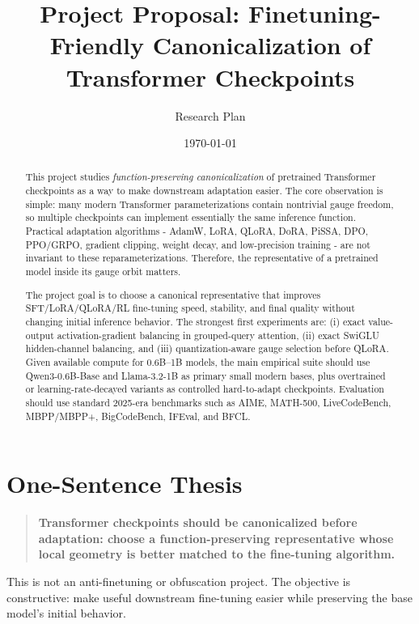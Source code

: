 \documentclass[11pt]{article}
\title{Project Proposal: Finetuning-Friendly Canonicalization of Transformer Checkpoints}
\author{Research Plan}
\date{\today}
\begin{document}
\maketitle

\begin{abstract}
This project studies \emph{function-preserving canonicalization} of pretrained Transformer checkpoints as a way to make downstream adaptation easier. The core observation is simple: many modern Transformer parameterizations contain nontrivial gauge freedom, so multiple checkpoints can implement essentially the same inference function. Practical adaptation algorithms - AdamW, LoRA, QLoRA, DoRA, PiSSA, DPO, PPO/GRPO, gradient clipping, weight decay, and low-precision training - are not invariant to these reparameterizations. Therefore, the representative of a pretrained model inside its gauge orbit matters.

The project goal is to choose a canonical representative that improves SFT/LoRA/QLoRA/RL fine-tuning speed, stability, and final quality without changing initial inference behavior. The strongest first experiments are: (i) exact value-output activation-gradient balancing in grouped-query attention, (ii) exact SwiGLU hidden-channel balancing, and (iii) quantization-aware gauge selection before QLoRA. Given available compute for 0.6B--1B models, the main empirical suite should use Qwen3-0.6B-Base and Llama-3.2-1B as primary small modern bases, plus overtrained or learning-rate-decayed variants as controlled hard-to-adapt checkpoints. Evaluation should use standard 2025-era benchmarks such as AIME, MATH-500, LiveCodeBench, MBPP/MBPP+, BigCodeBench, IFEval, and BFCL.
\end{abstract}

\tableofcontents

\section{One-Sentence Thesis}

\begin{quote}
\textbf{Transformer checkpoints should be canonicalized before adaptation: choose a function-preserving representative whose local geometry is better matched to the fine-tuning algorithm.}
\end{quote}

This is not an anti-finetuning or obfuscation project. The objective is constructive: make useful downstream fine-tuning easier while preserving the base model's initial behavior.
\end{document}
